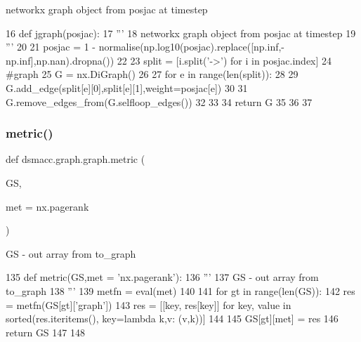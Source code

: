 \begin{DoxyVerb}networkx graph object from posjac at timestep
\end{DoxyVerb}
 
\begin{DoxyCode}
16 \textcolor{keyword}{def }jgraph(posjac):
17     \textcolor{stringliteral}{'''}
18 \textcolor{stringliteral}{    networkx graph object from posjac at timestep}
19 \textcolor{stringliteral}{    '''}
20 
21     posjac = 1 - normalise(np.log10(posjac).replace([np.inf,-np.inf],np.nan).dropna())
22 
23     split = [i.split(\textcolor{stringliteral}{'->'}) \textcolor{keywordflow}{for} i \textcolor{keywordflow}{in} posjac.index]
24     \textcolor{comment}{#graph}
25     G = nx.DiGraph()
26 
27     \textcolor{keywordflow}{for} e \textcolor{keywordflow}{in} range(len(split)):
28 
29             G.add\_edge(split[e][0],split[e][1],weight=posjac[e])
30 
31     G.remove\_edges\_from(G.selfloop\_edges())
32 
33 
34     \textcolor{keywordflow}{return} G
35 
36 
37     
\end{DoxyCode}
\mbox{\label{namespacedsmacc_1_1graph_1_1graph_addafb8b938b7dc46ee5f4e87b0dc0ebe}} 
\subsubsection{\texorpdfstring{metric()}{metric()}}
{\footnotesize\ttfamily def dsmacc.\+graph.\+graph.\+metric (\begin{DoxyParamCaption}\item[{}]{GS,  }\item[{}]{met = {\ttfamily \textquotesingle{}nx.pagerank\textquotesingle{}} }\end{DoxyParamCaption})}

\begin{DoxyVerb}GS - out array from to_graph
\end{DoxyVerb}
 
\begin{DoxyCode}
135 \textcolor{keyword}{def }metric(GS,met = 'nx.pagerank'):
136     \textcolor{stringliteral}{'''}
137 \textcolor{stringliteral}{    GS - out array from to\_graph}
138 \textcolor{stringliteral}{    '''}
139     metfn = eval(met)
140 
141     \textcolor{keywordflow}{for} gt \textcolor{keywordflow}{in} range(len(GS)):
142         res = metfn(GS[gt][\textcolor{stringliteral}{'graph'}])
143         res = [[key, res[key]] \textcolor{keywordflow}{for} key, value \textcolor{keywordflow}{in} sorted(res.iteritems(), key=\textcolor{keyword}{lambda} k,v: (v,k))]
144 
145         GS[gt][met] = res
146     \textcolor{keywordflow}{return} GS
147 
148 
\end{DoxyCode}
\mbox{\label{namespacedsmacc_1_1graph_1_1graph_af1100c886b7f48a0287ba1fe0accc785}} 
